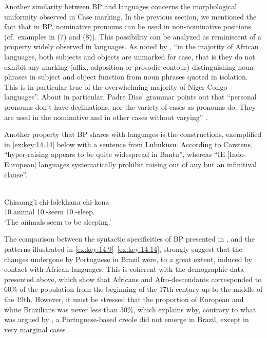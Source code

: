 \documentclass[output=paper]{langsci/langscibook}
\begin{document}
Another similarity between \gls{BP} and  languages concerns the
morphological uniformity observed in Case marking. In the previous section, we
mentioned the fact that in BP, nominative pronouns can be used in
non-nominative positions (cf.\ examples in (7) and (8)). This possibility can
be analyzed as reminiscent of a property widely observed in 
languages. As noted by \citet[233]{Creissels2000}, “in the majority of African
languages, both subjects and objects are unmarked for case, that is they do not
exhibit any marking (affix, adposition or prosodic contour) distinguishing noun
phrases in subject and object function from noun phrases quoted in isolation.
This is in particular true of the overwhelming majority of Niger-Congo
languages”.  About  in particular, Padre Dias' grammar points out
that “personal pronouns don’t have declinations, nor the variety of cases as
 pronouns do. They are used in the nominative
and in other cases without varying” \parencite[8]{Dias2006}.

Another property that \gls{BP} shares with  languages is the
 constructions, exemplified in \eqref{ex:key:14.14} below with a
sentence from Lubukusu. According to Carstens, “hyper-raising appears to be
quite widespread in Bantu”, whereas “IE [Indo-European] languages
systematically prohibit raising out of any but an infinitival clause”.

\ea%
    \label{ex:key:14.14}  \parencite[725]{Carstens2011}\\
    \gll  Chisaang’i chi-lolekhana chi-kona\\
          10.animal 10.\Sm{}-seem 10.\Sm{}-sleep.\Prs\\
    \glt  ‘The animals seem to be sleeping.’
\z

The comparison between the syntactic specificities of \gls{BP} presented in
, and the  patterns illustrated in
\eqref{ex:key:14.9}--\eqref{ex:key:14.14}, strongly suggest that the changes
undergone by Portuguese in Brazil were, to a great extent, induced by contact
with African languages. This is coherent with the demographic data presented
above, which show that Africans and Afro-descendants corresponded to 60\% of
the population from the beginning of the 17th century up to the middle of the
19th. However, it must be stressed that the proportion of European and white
Brazilians was never less than 30\%, which explains why, contrary to what was
argued by \citet{Guy1981}, a Portuguese-based creole did not emerge in Brazil,
except in very marginal cases \parencite[70]{Lucchesi2009a}.
\end{document}

